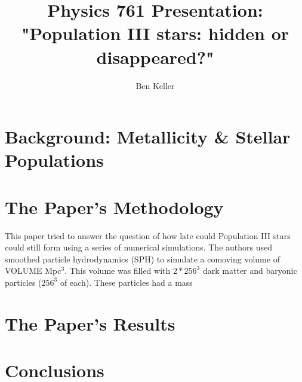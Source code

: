 \documentclass{article}
\author{Ben Keller}
\title{Physics 761 Presentation: "Population III stars: hidden or disappeared?"}
\begin{document}
\maketitle
\section{Background: Metallicity \& Stellar Populations}
\section{The Paper's Methodology}
This paper tried to answer the question of how late could Population III stars
could still form using a series of numerical simulations.  The authors used 
smoothed particle hydrodynamics (SPH) to simulate a comoving volume of VOLUME 
Mpc$^3$.  This volume was filled with $2*256^3$ dark matter and baryonic 
particles ($256^3$ of each).  These particles had a mass 
\section{The Paper's Results}
\section{Conclusions}
\end{document}
